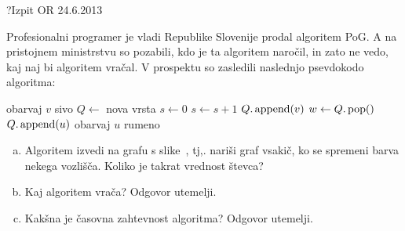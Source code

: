 \begin{naloga}{?}{Izpit OR 24.6.2013}
\begin{vprasanje}[pog]
Profesionalni programer je vladi Republike Slovenije
prodal algoritem {\sc PoG}.
A na pristojnem ministrstvu so pozabili, kdo je ta algoritem naročil,
in zato ne vedo, kaj naj bi algoritem vračal.
V prospektu so zasledili naslednjo psevdokodo algoritma:
\begin{small}
\begin{algorithmic}
    \State obarvaj $v$ sivo
\EndFor
\State $Q \gets$ nova vrsta
\State $s \gets 0$
        \State $s \gets s+1$
        \State $Q.\operatorname{append}(v)$
            \State $w \gets Q.\operatorname{pop}()$
                    \State $Q.\operatorname{append}(u)$
                    \State obarvaj $u$ rumeno
                \EndIf
            \EndFor
        \EndWhile
    \EndIf
\EndFor
\State {}
\end{algorithmic}
\end{small}

\begin{enumerate}[(a)]
\item Algoritem izvedi na grafu s slike~\fig{},
tj,. nariši graf vsakič, ko se spremeni barva nekega vozlišča.
Koliko je takrat vrednost števca?

\item Kaj algoritem vrača?
Odgovor utemelji.

\item Kakšna je časovna zahtevnost algoritma?
Odgovor utemelji.
\end{enumerate}

\begin{slika}
\pgfslika
{}
\end{slika}
\end{vprasanje}
\begin{odgovor}
\end{odgovor}
\end{naloga}


